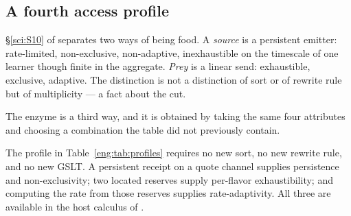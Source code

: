 \subsection{A fourth access profile}\label{eng:S4.1}

\S\ref{sci:S10} of \chSci separates two ways of being food. A \emph{source} is
a persistent emitter: rate-limited, non-exclusive, non-adaptive,
inexhaustible on the timescale of one learner though finite in the
aggregate. \emph{Prey} is a linear send: exhaustible, exclusive, adaptive.
The distinction is not a distinction of sort or of rewrite rule but of
multiplicity --- a fact about the cut.

The enzyme is a third way, and it is obtained by taking the same four
attributes and choosing a combination the table did not previously contain.

\begin{table}[t]
\centering\small
{}
\caption{The enzyme as a fourth access profile. It is source-like in
persistence and non-exclusivity, prey-like in exhaustibility, and unique
in that what adapts is not its behavior under attack but its
\emph{terms}.}
\label{eng:tab:profiles}
\end{table}

\begin{proposition}\label{eng:engine-derived-imported}
The profile in Table~\ref{eng:tab:profiles} requires no new sort, no new
rewrite rule, and no new GSLT. A persistent receipt on a quote channel
supplies persistence and non-exclusivity; two located reserves supply
per-flavor exhaustibility; and computing the rate from those reserves
supplies rate-adaptivity. All three are available in the host calculus of
\chSci.
\end{proposition}

